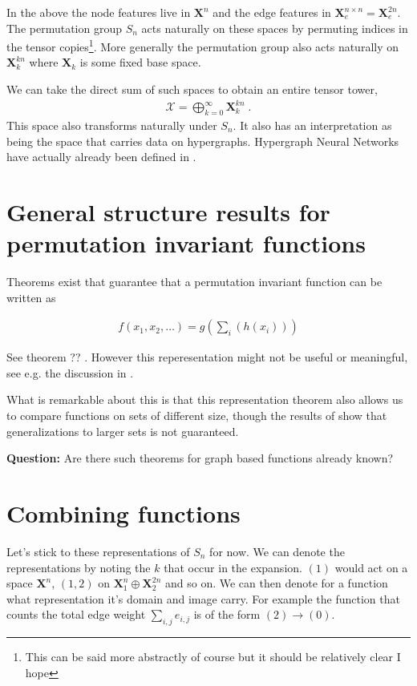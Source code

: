\documentclass[reprint,twocolumn,amsmath,amssymb,aps]{revtex4-1}
\newcommand{\XX}{\mathcal{X}}
\newcommand{\X}{\mathbf{X}}
\begin{document}
In the above the node features live in $\X^n$ and the edge features in $\X_e^{n \times n} = \X_e^{2n}$. The permutation group $S_n$ acts naturally on these spaces by permuting indices in the tensor copies\footnote{This can be said more abstractly of course but it should be relatively clear I hope}. More generally the permutation group also acts naturally on $\X_k^{kn}$ where $\X_k$ is some fixed base space.

We can take the direct sum of such spaces to obtain an entire tensor tower,
\begin{align}
\XX = \bigoplus_{k=0}^{\infty} \X_k^{kn} \;.
\end{align}
This space also transforms naturally under $S_n$. It also has an interpretation as being the space that carries data on hypergraphs. Hypergraph Neural Networks have actually already been defined in \cite{feng2019hypergraph}.


\section{General structure results for permutation invariant functions}

Theorems exist that guarantee that a permutation invariant function can be written as

\begin{align} \label{eq::1 to 0 structure}
f(x_1, x_2, \dots) = g \left(\sum_i (h(x_i))\right)
\end{align}

See theorem ?? \citet{zaheer2017deep}. However this reperesentation might not be useful or meaningful, see e.g. the discussion in \citet{wagstaff2019limitations}.

What is remarkable about this is that this representation theorem also allows us to compare functions on sets of different size, though the results of \citet{wagstaff2019limitations} show that generalizations to larger sets is not guaranteed.

\textbf{Question: } Are there such theorems for graph based functions already known?

\section{Combining functions}

Let's stick to these representations of $S_n$ for now. We can denote the representations by noting the $k$ that occur in the expansion. $(1)$ would act on a space $\X^n$, $(1,2)$ on $\X_1^n \oplus \X_2^{2n}$ and so on. We can then denote for a function what representation it's domain and image carry. For example the function that counts the total edge weight $\sum_{i,j} e_{i,j}$ is of the form $(2) \rightarrow (0)$.
\end{document}
